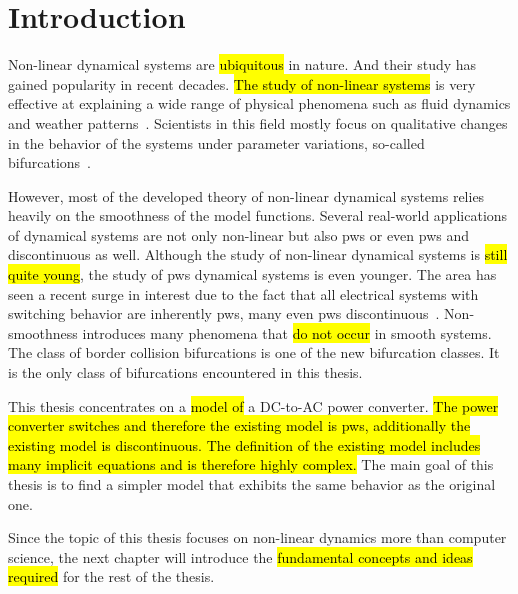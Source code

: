 \chapter{Introduction}
\label{chap:intro}

Non-linear dynamical systems are \hl{ubiquitous} in nature.
And their study has gained popularity in recent decades.
\hl{The study of non-linear systems} is very effective at explaining a wide range of physical phenomena such as fluid dynamics and weather patterns~\cite{bernardo2008piecewise}.
Scientists in this field mostly focus on qualitative changes in the behavior of the systems under parameter variations, so-called bifurcations~\cite{simpson2010}.

However, most of the developed theory of non-linear dynamical systems relies heavily on the smoothness of the model functions.
Several real-world applications of dynamical systems are not only non-linear but also \gls{pws} or even \gls{pws} and discontinuous as well.
Although the study of non-linear dynamical systems is \hl{still quite young}, the study of \gls{pws} dynamical systems is even younger.
The area has seen a recent surge in interest due to the fact that all electrical systems with switching behavior are inherently \gls{pws}, many even \gls{pws} discontinuous~\cite{simpson2010}.
Non-smoothness introduces many phenomena that \hl{do not occur} in smooth systems.
The class of border collision bifurcations is one of the new bifurcation classes.
It is the only class of bifurcations encountered in this thesis.

This thesis concentrates on a \hl{model of} a DC-to-AC power converter.
\hl{
	The power converter switches and therefore the existing model is \gls{pws}, additionally the existing model is discontinuous.
	The definition of the existing model includes many implicit equations and is therefore highly complex.
}
The main goal of this thesis is to find a simpler model that exhibits the same behavior as the original one.

Since the topic of this thesis focuses on non-linear dynamics more than computer science, the next chapter will introduce the \hl{fundamental concepts and ideas required} for the rest of the thesis.

